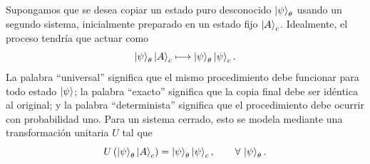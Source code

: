 \documentclass[../main.tex]{subfiles}
\begin{document}
Supongamos que se desea copiar un estado puro desconocido $\ket{\psi}_\theta$ usando un segundo sistema, inicialmente preparado en un estado fijo $\ket{A}_c$. Idealmente, el proceso tendría que actuar como
\begin{equation*}
    \ket{\psi}_\theta\ket{A}_c
    \longmapsto
    \ket{\psi}_\theta\ket{\psi}_c.
\end{equation*}
La palabra ``universal'' significa que el mismo procedimiento debe funcionar para todo estado $\ket{\psi}$; la palabra ``exacto'' significa que la copia final debe ser idéntica al original; y la palabra ``determinista'' significa que el procedimiento debe ocurrir con probabilidad uno. Para un sistema cerrado, esto se modela mediante una transformación unitaria $U$ tal que
\begin{equation*}
    U\left(\ket{\psi}_\theta\ket{A}_c\right)
    =
    \ket{\psi}_\theta\ket{\psi}_c,
    \qquad
    \forall\,\ket{\psi}_\theta.
\end{equation*}
\end{document}
